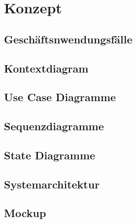 \section{Konzept}
\subsection{Geschäftsnwendungsfälle}
\newpage
\subsection{Kontextdiagram}
\newpage
\subsection{Use Case Diagramme}
\newpage
\subsection{Sequenzdiagramme}
\newpage
\subsection{State Diagramme}
\newpage
\subsection{Systemarchitektur}
\newpage
\subsection{Mockup}
